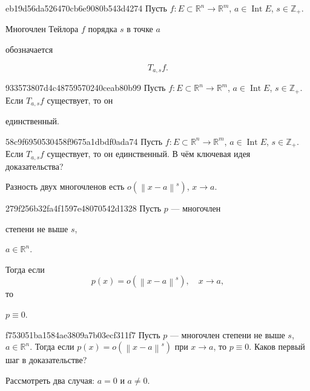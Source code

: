 \begin{note}{eb19d56da526470cb6e9080b543d4274}
    Пусть \({ f : E \subset \mathbb R^{n} \to \mathbb R^{m} }\), \({ a \in \operatorname{Int} E }\), \({ s \in \mathbb Z_+ }\).
    \begin{icloze}{2}Многочлен Тейлора \({ f }\) порядка \({ s }\) в точке \({ a }\)\end{icloze} обозначается
    \begin{icloze}{1}
        \[
            T_{a,s}f.
        \]
    \end{icloze}
\end{note}

\begin{note}{933573807d4c48759570240ceab80b99}
    Пусть \({ f : E \subset \mathbb R^{n} \to \mathbb R^{m} }\), \({ a \in \operatorname{Int} E }\), \({ s \in \mathbb Z_+ }\).
    Если \({ T_{a,s}f }\) существует, то он \begin{icloze}{1}единственный.\end{icloze}
\end{note}

\begin{note}{58c9f6950530458f9675a1dbdf0ada74}
    Пусть \({ f : E \subset \mathbb R^{n} \to \mathbb R^{m} }\), \({ a \in \operatorname{Int} E }\), \({ s \in \mathbb Z_+ }\).
    Если \({ T_{a,s}f }\) существует, то он единственный.
    В чём ключевая идея доказательства?

    \begin{cloze}{1}
        Разность двух многочленов есть \({ o(\left\lVert x - a \right\rVert^{s}) }\), \({ x \to a }\).
    \end{cloze}
\end{note}

\begin{note}{279f256b32fa4f1597e48070542d1328}
    Пусть \({ p }\) --- многочлен \begin{icloze}{2}степени не выше \({ s }\),\end{icloze} \begin{icloze}{3}\({ a \in \mathbb R^{n} }\).\end{icloze}
    Тогда если
    \[
        p(x) = o(\left\lVert x - a \right\rVert^{s}), \quad x \to a,
    \]
    то \begin{icloze}{1}\({ p \equiv 0 }\).\end{icloze}
\end{note}

\begin{note}{f753051ba1584ae3809a7b03ecf311f7}
    Пусть \({ p }\) --- многочлен степени не выше \({ s }\), \({ a \in \mathbb R^{n} }\).
    Тогда если \({ p(x) = o(\left\lVert x - a \right\rVert^{s}) }\) при \({ x \to a }\), то \({ p \equiv 0 }\).
    Каков первый шаг в доказательстве?

    \begin{cloze}{1}
        Рассмотреть два случая: \({ a = 0 }\) и \({ a \neq 0 }\).
    \end{cloze}
\end{note}

